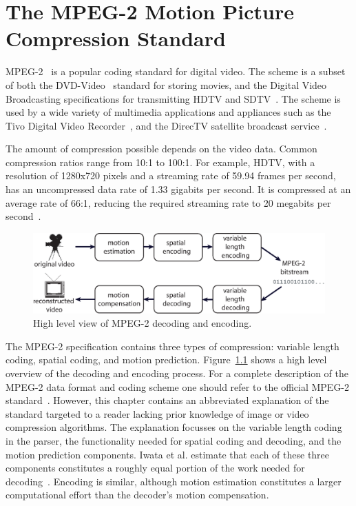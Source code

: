 \chapter{The MPEG-2 Motion Picture Compression Standard}
\label{chapter:mpeg2}

MPEG-2~\cite{MPEG2} is a popular coding standard for
digital video. 
The scheme is a subset of both the DVD-Video~\cite{Taylor:1999:SDV} 
standard for storing movies, and the Digital Video Broadcasting 
specifications for transmitting HDTV and SDTV~\cite{DVB}. The scheme is
used by a wide variety of multimedia applications and appliances such
as the Tivo Digital Video Recorder~\cite{tivo}, and the DirecTV satellite broadcast
service~\cite{directv}. 

The amount of compression possible depends on the video data. 
Common compression ratios range
from 10:1 to 100:1. For example, HDTV, with a resolution of 1280x720
pixels and a streaming rate of 59.94 frames per second, has an
uncompressed data rate of 1.33 gigabits per second. It is compressed at
an average rate of 66:1, reducing the required streaming rate to
20 megabits per second~\cite{imagevidstandards}.

\begin{figure}
  \begin{center}
    \includegraphics[scale=0.7, angle=0]{./mpeg2_overview.eps}
    \caption{High level view of MPEG-2 decoding and encoding.}
    \label{fig:mpeg2_overview}
  \end{center}
\end{figure}

The MPEG-2 specification contains three types of compression:
variable length coding, spatial coding, and motion prediction.
Figure~\ref{fig:mpeg2_overview} shows a high level overview
of the decoding and encoding process. 
For a complete description of the MPEG-2 data format and coding
scheme one should refer to
the official MPEG-2 standard~\cite{MPEG2}. However, this chapter
contains an abbreviated explanation of the 
standard targeted to a reader lacking prior knowledge of image or video
compression algorithms. The explanation focusses on the 
variable length coding in the parser, 
the functionality needed for spatial coding and decoding,
and the motion prediction components. Iwata et al. estimate that each of these three 
components constitutes a roughly equal portion of the work needed for 
decoding~\cite{iwata98coarse}. Encoding is similar, although
motion estimation constitutes a larger computational effort than
the decoder's motion compensation.


